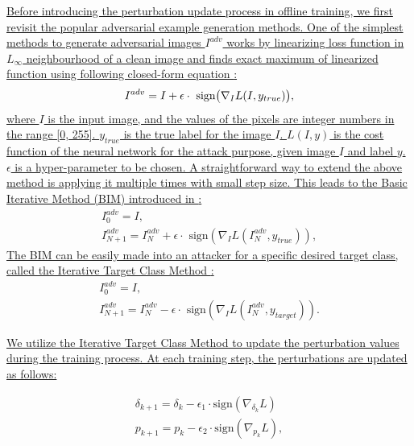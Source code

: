 \documentclass[12pt]{article}
\begin{document}
\uline{Before introducing the perturbation update process in offline training, we first revisit the popular adversarial example generation methods. One of the simplest methods to generate adversarial images $I^{adv}$ works by linearizing loss function in $L_{\infty}$ neighbourhood of a clean image and finds exact maximum of linearized function using following closed-form equation \cite{FGSM}:}
\begin{equation}
    I^{adv} = I + \epsilon \cdot \text{ sign} \bigl( \nabla_I L(I, y_{true})  \bigr),
    \vspace{-0.1cm}
\end{equation}
\uline{where $I$ is the input image, and the values of the pixels are integer numbers in the range [0, 255]. $y_{true}$ is the true label for the image $I$. $L(I, y)$ is the cost function of the neural network for the attack purpose, given image $I$ and label $y$. $\epsilon$ is a hyper-parameter to be chosen. A straightforward way to extend the above method is applying it multiple times with small step size. This leads to the Basic Iterative Method (BIM) introduced in \cite{DBLP:conf/iclr/KurakinGB17a}:}
\begin{equation}
    \begin{gathered}
        I_0^{adv} = I, \\
        I_{N+1}^{adv} = I_N^{adv}+\epsilon \cdot \text{ sign}(\nabla_I L(I_N^{adv},y_{true})),
    \end{gathered}
\end{equation}
\uline{The BIM can be easily made into an attacker for a specific desired target class, called the Iterative Target Class Method \cite{DBLP:conf/iclr/KurakinGB17a}:}
\begin{equation}
  \begin{gathered}
      I_0^{adv} = I,\\
      I_{N+1}^{adv} = I_N^{adv}-\epsilon \cdot \text{ sign}(\nabla_I L(I_N^{adv},y_{target})).
  \end{gathered}
\end{equation}

\uline{We utilize the Iterative Target Class Method to update the perturbation values during the training process. At each training step, the perturbations are updated as follows:}

\begin{gather}
  \delta_{k+1} = \delta_{k} - \epsilon_1 \cdot \text{sign}(\nabla_{\delta_k}L)\\
  p_{k+1} = p_{k} - \epsilon_2 \cdot \text{sign}(\nabla_{p_k}L),
\end{gather}
\end{document}
